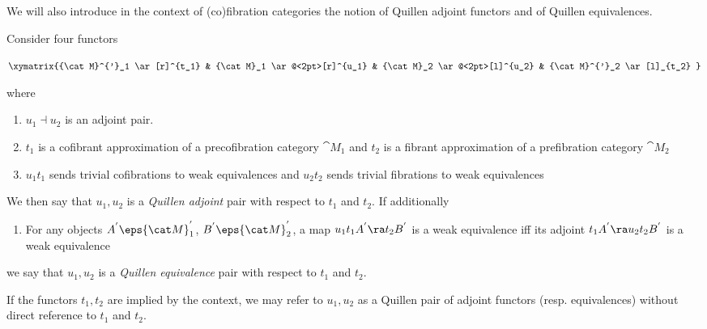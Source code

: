We will also introduce in the context of (co)fibration categories the notion of Quillen adjoint functors and of Quillen equivalences.

\begin{defn}
\label{defn:quillenadjoint}
Consider four functors
\begin{center}
$\xymatrix {{\cat M}^{'}_1 \ar[r]^{t_1} & {\cat M}_1 \ar@<2pt>[r]^{u_1} & {\cat M}_2 \ar@<2pt>[l]^{u_2} & {\cat M}^{'}_2 \ar[l]_{t_2} }$
\end{center}
where 
\begin{enumerate}
\item
$u_1 \dashv u_2$ is an adjoint pair.
\item
$t_1$ is a cofibrant approximation of a precofibration category ${\cat M}_1$ and $t_2$ is a fibrant approximation of a prefibration category ${\cat M}_2$
\item
$u_1t_1$ sends trivial cofibrations to weak equivalences and $u_2t_2$ sends trivial fibrations to weak equivalences
\end{enumerate}

We then say that $u_1, u_2$ is a {\it Quillen adjoint} pair with respect to $t_1$ and $t_2$. If additionally 
\begin{enumerate}
\item[(4)]
For any objects $A^{'} \eps {\cat M}^{'}_1$, $B^{'} \eps {\cat M}^{'}_2$, a map $u_1t_1A^{'} \ra t_2B^{'}$ is a weak equivalence iff its adjoint $t_1A^{'} \ra u_2t_2B^{'}$ is a weak equivalence
\end{enumerate}
we say that $u_1, u_2$ is a {\it Quillen equivalence} pair with respect to $t_1$ and $t_2$.
\end{defn}

If the functors $t_1, t_2$ are implied by the context, we may refer to $u_1, u_2$ as a Quillen pair of adjoint functors (resp. equivalences) without direct reference to $t_1$ and $t_2$.

